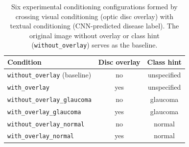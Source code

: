 \documentclass[runningheads]{llncs}
\begin{document}
\begin{table}[t]
  \centering
  \caption{Six experimental conditioning configurations formed by crossing visual conditioning (optic disc overlay) with textual conditioning (CNN-predicted disease label). The original image without overlay or class hint (\texttt{without\_overlay}) serves as the baseline.}
  \label{tab:conditions}
  \begin{tabular*}{0.8\linewidth}{@{\extracolsep{\fill}}lcc@{}}
    \toprule
    \textbf{Condition} & \textbf{Disc overlay} & \textbf{Class hint} \\
    \midrule
    \texttt{without\_overlay} (baseline) & no  & unspecified \\
    \texttt{with\_overlay}               & yes & unspecified \\
    \texttt{without\_overlay\_glaucoma}  & no  & glaucoma \\
    \texttt{with\_overlay\_glaucoma}     & yes & glaucoma \\
    \texttt{without\_overlay\_normal}    & no  & normal \\
    \texttt{with\_overlay\_normal}       & yes & normal \\
    \bottomrule
  \end{tabular*}
\end{table}
\end{document}

